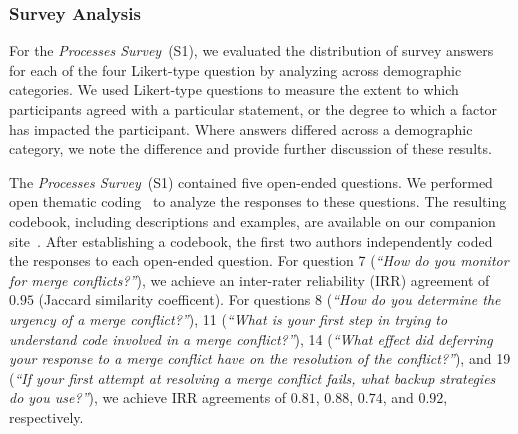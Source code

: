 \subsubsection{Survey Analysis}

For the \textit{Processes Survey}~(S1), we evaluated the distribution of survey answers for each of the four Likert-type question by analyzing across demographic categories.
We used Likert-type questions to measure the extent to which participants agreed with a particular statement, or the degree to which a factor has impacted the participant.
Where answers differed across a demographic category, we note the difference and provide further discussion of these results.

The \textit{Processes Survey}~(S1) contained five open-ended questions.
We performed open thematic coding~\cite{fereday2006demonstrating} to analyze the responses to these questions.
The resulting codebook, including descriptions and examples, are available on our companion site~\cite{companion_site}.
After establishing a codebook, the first two authors independently coded the responses to each open-ended question.
For question 7 (\textit{``How do you monitor for merge conflicts?''}), we achieve an inter-rater reliability (IRR) agreement of $0.95$ (Jaccard similarity coefficent).
For questions 8 (\textit{``How do you determine the urgency of a merge conflict?''}), 11 (\textit{``What is your first step in trying to understand code involved in a merge conflict?''}), 14 (\textit{``What effect did deferring your response to a merge conflict have on the resolution of the conflict?''}), and 19 (\textit{``If your first attempt at resolving a merge conflict fails, what backup strategies do you use?''}), we achieve IRR agreements of $0.81$, $0.88$, $0.74$, and $0.92$, respectively.

